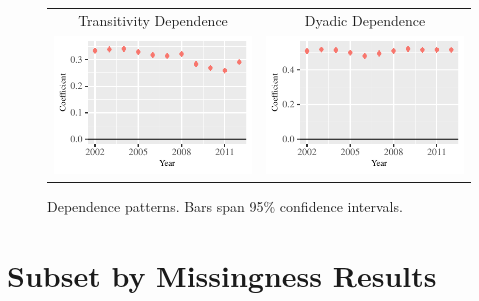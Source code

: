 \documentclass[reqno,onecolumn,letterpaper,12pt]{article}
\begin{document}
\begin{figure}[!h]
\centering
\begin{tabular}{@{\hskip -.05cm}c@{\hskip .2cm}c}
Transitivity Dependence  & Dyadic Dependence\\
\includegraphics[height=.165\textheight, clip=true, trim=.5cm .5cm 0cm .1cm]{SI_figures/LSM_rl_plots/trans_dep.pdf}   &
\includegraphics[height=.165\textheight, clip=true, trim=.5cm .5cm 0cm .1cm]{SI_figures/LSM_rl_plots/dyad_dep.pdf} \\
\end{tabular}
\caption{\label{fig:AMEnetterms} Dependence patterns. Bars span 95\% confidence intervals. }
\end{figure}

\section{Subset by Missingness Results}\label{qlevelresults}
\end{document}
